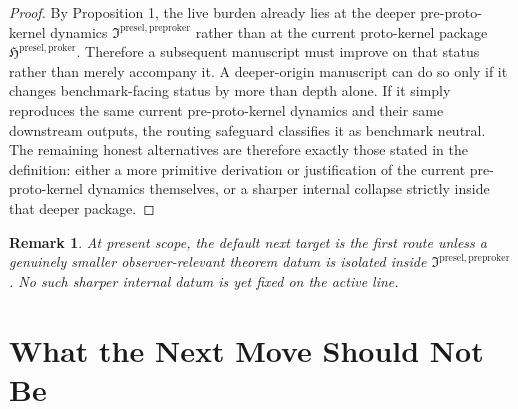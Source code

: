 \documentclass[11pt]{article}
\newcommand{\PreProtoKernelPackage}{\mathfrak I^{\mathrm{presel,preproker}}}
\newcommand{\ProtoKernelPackage}{\mathfrak H^{\mathrm{presel,proker}}}
\newtheorem{remark}{Remark}
\begin{document}
\begin{proof}
By Proposition 1, the live burden already lies at the deeper pre-proto-kernel dynamics \(\PreProtoKernelPackage\) rather than at the current proto-kernel package \(\ProtoKernelPackage\). Therefore a subsequent manuscript must improve on that status rather than merely accompany it. A deeper-origin manuscript can do so only if it changes benchmark-facing status by more than depth alone. If it simply reproduces the same current pre-proto-kernel dynamics and their same downstream outputs, the routing safeguard classifies it as benchmark neutral. The remaining honest alternatives are therefore exactly those stated in the definition: either a more primitive derivation or justification of the current pre-proto-kernel dynamics themselves, or a sharper internal collapse strictly inside that deeper package.
\end{proof}

\begin{remark}
At present scope, the default next target is the first route unless a genuinely smaller observer-relevant theorem datum is isolated inside \(\PreProtoKernelPackage\). No such sharper internal datum is yet fixed on the active line.
\end{remark}

\section{What the Next Move Should Not Be}
\end{document}
